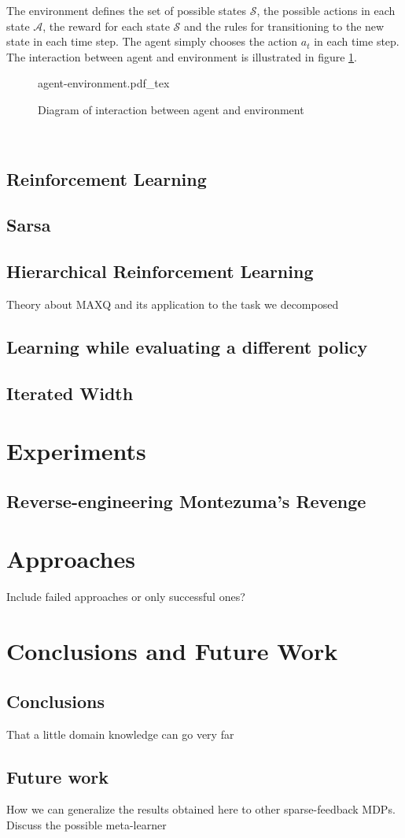 \documentclass[12pt,a4paper,oneside]{report}
\begin{document}
The environment defines the set of possible states $\mathcal{S}$, the possible
actions in each state $\mathcal{A}$, the reward for each state $\mathcal{S}$ and
the rules for transitioning to the new state in each time step. The agent simply
chooses the action $a_t$ in each time step. The interaction between agent and
environment is illustrated in figure \ref{fig:agent-environment}.

\begin{figure}[hbtp]
\begin{center}
  \def\svgscale{1}
  {agent-environment.pdf_tex}
\end{center}
\caption{Diagram of interaction between agent and environment
  \cite{sutton1998introduction}\label{fig:agent-environment}}

\end{figure}

\


\section{Reinforcement Learning}
\section{Sarsa}
\section{Hierarchical Reinforcement Learning}
Theory about MAXQ and its application to the task we decomposed
\section{Learning while evaluating a different policy}
\section{Iterated Width}

\chapter{Experiments}
\section{Reverse-engineering Montezuma's Revenge}

\chapter{Approaches}
Include failed approaches or only successful ones?



\chapter{Conclusions and Future Work}
  \section{Conclusions}
  That a little domain knowledge can go very far
  \section{Future work}
  How we can generalize the results obtained here to other sparse-feedback MDPs.
  Discuss the possible meta-learner

\newpage
\printbibliography
\end{document}
